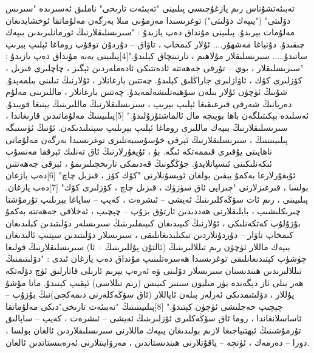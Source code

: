 \documentclass[a4paper]{article}
\begin{document}
تەبىئەتشۇناس رىم يازغۇچىسى پىلىينى "تەبىئەت تارىخى" ناملىق ئەسىرىدە "سىرىس دۆلىتى" ("يىپەك دۆلىتى") توغرىسىدا مەزمۇنى مىلا بەرگەن مەلۇماتقا ئوخشايدىغان مەلۇمات بېرىدۇ. پىلىينى مۇنداق دەپ يازىدۇ : "سىرىسلىقلارنىڭ ئورمانلىرىدىن يىپەك چىقىدۇ. دۇنياغا مەشھۇر.... ئۇلار كىمخاپ ، تاۋاق – دۇردۇن توقۇپ روماغا ئېلىپ بېرىپ ساتىدۇ..... سىرىسلىقلار مۇلاھىم ، تارتىنچاق كېلىدۇ."[4]پىلىينى يەنە مۇنداق دەپ يازىدۇ : "سىرىسلىقلار ، بوي – تۇرقى جەھەتتە ئادەتتىكى ئادەملەردىن ئېگىز ، چاچلىرى قىزىل ، كۆزلىرى كۆك ، ئاۋازلىرى جاراڭلىق كېلىدۇ. چەتتىن بارغانلار ، ئۇلارنىڭ تىلىنى بىلمەيدۇ. شۇنىڭ ئۈچۈن ئۇلار بىلەن سۆھبەتلىشەلمەيدۇ. چەتتىن بارغانلار ، ماللىرىنى مەلۇم دەريانىڭ شەرقى قىرغىقىغا ئېلىپ بېرىپ ، سىرىسلىقلارنىڭ ماللىرىنىڭ يېنىغا قويىدۇ. ئەسلىدە بېكىتىلگەن باھا بويىچە مال ئالماشتۇرۇلىدۇ." [5]پىلىيىنىڭ مەلۇماتىدىن قارىغاندا ، سىرىسلىقلارنىڭ يىپەك ماللىرى روماغا ئېلىپ بېرىلىپ سېتىلىدىكەن. ئۇنىڭ ئۈستىگە پىلىيىنىنىڭ ، سىرىسلىقلارنىڭ ئېرقى خۇسۇسىيەتلىرى توغرىسىدا بەرگەن مەلۇماتى ناھايىتى يۇقىرى قىممەتكە ئىگە. بۇ ، ئۇيغۇرلارنىڭ ئاق تەنلىك ئېرققا مەنسۇپ ئىكەنلىكىنى ئىسپاتلايدۇ. جۇڭگونىڭ قەدىمكى تارىخچىلىرىمۇ ، ئېرقى جەھەتتىن ئۇيغۇرلارغا بەكمۇ يېقىن بولغان ئويسۇنلارنى "كۆك كۆز ، قىزىل چاچ" [6]دەپ يازغان بولسا ، قىرغىزلارنى "چىرايى ئاق سۈزۈك ، قىزىل چاچ ، كۆزلىرى كۆك" [7]دەپ يازغان. پىلىيىنى ، رىم ئات سۆڭەكلىرىنىڭ ئەيشى – ئىشرەت ، كەيپ – ساپاغا بېرىلىپ تۇرمۇشتا چىرىكلىشىپ ، بايلىقلارنى ھەددىدىن ئارتۇق بزۇپ – چېچىپ ، ئەخلاقى جەھەتتە بەكمۇ بۇزۇلۇپ كەتكەنلىكى ، ئۇلارنىڭ كىيىدىغان كىيىملىرىنىڭ سىرىسلەر دۆلىتىدىن كېلىدىغان كىمخاپ تاۋار – دۇردۇنلاردىن تىكىلىدىغانلىقى ، سىرىسلار دۆلىتىدىن سېتىپ ئالىدىغان يىپەك ماللار ئۈچۈن رىم تىللالىرىنىڭ (ئالتۇن پۇللىرىنىڭ – ئا) سىرىسلىقلارنىڭ قولىغا چۈشۈپ كېتىدىغانلىقى توغرىسىدا ھەسرەتلىنىپ مۇنداق دەپ يازغان ئىدى : "دۆلىتىمنىڭ تىللالىرىدىن ھىندىستان سىرىسلار دۆلىتى ۋە ئەرەپ يېرىم ئارىلى قاتارلىق ئۈچ دۆلەتكە ھەر يىلى ئاز دېگەندە يۈز مىليون سىتىر كىيىس (رىم تىللاسى) ئېقىپ كېتىدۇ. مانا مۇشۇ پۇللار ، دۆلىتىمدىكى ئەرلەر بىلەن ئاياللار (ئاق سۆڭەكلەرنى دىمەكچى)نىڭ بۇزۇپ – چېچىپ خەجلىشى ئۈچۈن كېتىدۇ." [8]پىلىيىنىنىڭ "تەبىئەت تارىخى"دىكى مەلۇماتقا ئاساسلانغاندا ، روما ئاق سۆڭەكلىرى ئۆزلىرىنىڭ ئەيشى – ئىشرەت ، كەيپ – ساپالىق تۇرمۇشىنىڭ ئېھتىياجىغا لازىم بولىدىغان يىپەك ماللارنى سىرىسلىقلاردىن ئالغان بولسا ، دورا – دەرمەك ، ئۈنچە – ياقۇتلارنى ھىندىستاندىن ، مەرۋايىتلارنى ئەرەبىستاندىن ئالغان.
\end{document}

